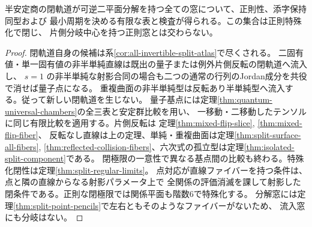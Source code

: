 \begin{corollary}\label{cor:all-split-attraction-atlas}
半安定商の閉軌道が可逆二平面分解を持つ全ての窓について、正則性、添字保持同型および
最小周期を決める有限な表と検査が得られる。この集合は正則特殊化で閉じ、
片側分岐中心を持つ正則窓とは交わらない。
\end{corollary}
\begin{proof}
閉軌道自身の候補は系\ref{cor:all-invertible-split-atlas}で尽くされる。
二固有値・単一固有値の非半単純直線は既出の量子または例外片側反転の閉軌道へ流入し、
$s=1$ の非半単純な射影合同の場合も二つの通常の行列のJordan成分を共役で消せば量子点になる。
重複曲面の非半単純型は反転あり半単純型へ流入する。従って新しい閉軌道を生じない。
量子基点には定理\ref{thm:quantum-universal-chambers}の全三表と安定群比較を用い、
一移動・二移動したテンソルに同じ有限比較を適用する。片側反転は
定理\ref{thm:mixed-flip-slice}, \ref{thm:mixed-flip-fiber}、
反転なし直線は上の定理、単純・重複曲面は定理\ref{thm:split-surface-all-fibers},
\ref{thm:reflected-collision-fibers}、六次式の孤立型は定理\ref{thm:isolated-split-component}である。
閉極限の一意性で異なる基点間の比較も終わる。特殊化閉性は定理\ref{thm:split-regular-limits}。
点対応が直線ファイバーを持つ条件は、点と隣の直線からなる射影パラメータ上で
全関係の評価消滅を課して射影した閉条件である。正則な閉極限では関係平面も階数6で特殊化する。
分解窓には定理\ref{thm:split-point-pencils}で左右ともそのようなファイバーがないため、
流入窓にも分岐はない。
\end{proof}
